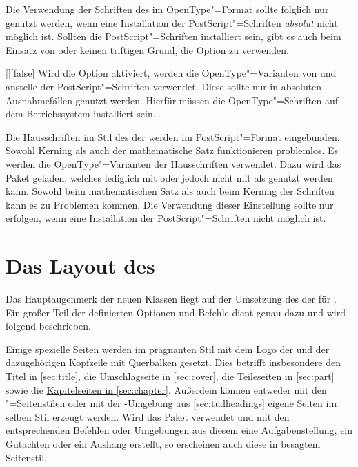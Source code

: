 Die Verwendung der Schriften des \CDs im OpenType"=Format sollte folglich nur 
genutzt werden, wenn eine Installation der PostScript"=Schriften \emph{absolut} 
nicht möglich ist. Sollten die PostScript"=Schriften installiert sein, gibt es 
auch beim Einsatz von  oder  keinen triftigen 
Grund, die Option  zu verwenden.

\begin{Declaration}[v2.02]{[\PBoolean]}[false]%
\printdeclarationlist%
%
Wird die Option aktiviert, werden die OpenType"=Varianten von \Univers und \DIN 
anstelle der PostScript"=Schriften verwendet. Diese sollte nur in absoluten
Ausnahmefällen genutzt werden. Hierfür müssen die OpenType"=Schriften auf dem 
Betriebssystem installiert sein.
\begin{values}
\itemfalse*
  Die Hausschriften im Stil des \CDs der \TnUD werden im PostScript"=Format 
  eingebunden. Sowohl Kerning als auch der mathematische Satz funktionieren 
  problemlos.
\itemtrue*
   Es werden die OpenType"=Varianten der Hausschriften verwendet. Dazu wird das 
   Paket  geladen, welches lediglich mit  
   oder  jedoch nicht mit  als genutzt werden 
   kann. Sowohl beim mathematischen Satz als auch beim Kerning der Schriften 
   kann es zu Problemen kommen. Die Verwendung dieser Einstellung sollte nur 
   erfolgen, wenn eine Installation der PostScript"=Schriften nicht möglich ist.
\end{values}
\end{Declaration}


\section{Das Layout des \CDs}
Das Hauptaugenmerk der neuen Klassen liegt auf der Umsetzung des \CDs der
\TnUD für . Ein großer Teil der definierten Optionen und Befehle
dient genau dazu und wird folgend beschrieben.

Einige spezielle Seiten werden im prägnanten Stil mit dem Logo der \TnUD und 
der dazugehörigen Kopfzeile mit Querbalken gesetzt. Dies betrifft insbesondere 
den \hyperref[sec:title]{Titel in \autoref{sec:title}}, die 
\hyperref[sec:cover]{Umschlagseite in \autoref{sec:cover}}, die 
\hyperref[sec:part]{Teileseiten in \autoref{sec:part}} sowie die
\hyperref[sec:chapter]{Kapitelseiten in \autoref{sec:chapter}}. 
Außerdem können entweder mit den "=Seitenstilen oder 
mit der -Umgebung aus \autoref{sec:tudheadings} eigene 
Seiten im selben Stil erzeugt werden. Wird das Paket  
verwendet und mit den entsprechenden Befehlen oder Umgebungen aus diesem eine 
Aufgabenstellung, ein Gutachten oder ein Aushang erstellt, so erscheinen auch 
diese in besagtem Seitenstil.


